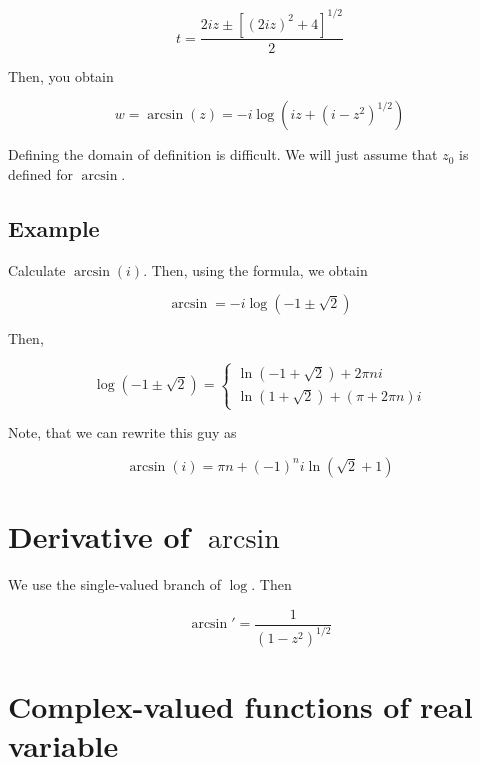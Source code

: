 \documentclass{article}
\newtheorem{one minute paper}[theorem]{One Minute Paper}
\begin{document}
\begin{equation}
    t = \frac{2iz \pm [(2iz)^2 + 4]^{1/2}}{2}
\end{equation}

Then, you obtain 

\begin{equation}
    w = \arcsin(z) = -i\log(iz + (i - z^2)^{1/2})
\end{equation}

Defining the domain of definition is difficult. We will just assume that $z_0$ is defined for $\arcsin$. 

\subsection*{Example}

Calculate $\arcsin(i)$. Then, using the formula, we obtain 

\begin{equation}
    \arcsin = -i\log(-1 \pm \sqrt{2})
\end{equation}

Then, 

\begin{equation}
    \log(-1 \pm \sqrt{2}) = \begin{cases}
        \ln(-1 + \sqrt{2}) + 2\pi n i \\
        \ln(1 + \sqrt{2}) + (\pi + 2\pi n)i
    \end{cases}
\end{equation}

Note, that we can rewrite this guy as 

\begin{equation}
    \arcsin(i) = \pi n + (-1)^{n} i \ln(\sqrt{2} + 1)
\end{equation}

\section*{Derivative of $\arcsin$}

We use the single-valued branch of $\log$. Then 

\begin{equation}
    \arcsin' = \frac{1}{(1-z^2)^{1/2}}
\end{equation}

\section*{Complex-valued functions of real variable}
\end{document}

